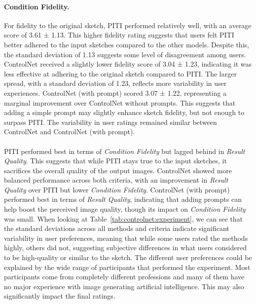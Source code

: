 \paragraph{Condition Fidelity.}
For fidelity to the original sketch, PITI performed relatively well, with an average score of 3.61 ± 1.13. This higher fidelity rating suggests that users felt PITI better adhered to the input sketches compared to the other models. Despite this, the standard deviation of 1.13 suggests some level of disagreement among users. ControlNet received a slightly lower fidelity score of 3.04 ± 1.23, indicating it was less effective at adhering to the original sketch compared to PITI. The larger spread, with a standard deviation of 1.23, reflects more variability in user experiences. ControlNet (with prompt) scored 3.07 ± 1.22, representing a marginal improvement over ControlNet without prompts. This suggests that adding a simple prompt may slightly enhance sketch fidelity, but not enough to surpass PITI. The variability in user ratings remained similar between ControlNet and ControlNet (with prompt).
\\
\\
PITI performed best in terms of \textit{Condition Fidelity} but lagged behind in \textit{Result Quality}. This suggests that while PITI stays true to the input sketches, it sacrifices the overall quality of the output images. ControlNet showed more balanced performance across both criteria, with an improvement in \textit{Result Quality} over PITI but lower \textit{Condition Fidelity}. ControlNet (with prompt) performed best in terms of \textit{Result Quality}, indicating that adding prompts can help boost the perceived image quality, though its impact on \textit{Condition Fidelity} was small. When looking at Table~\ref{tab:controlnet:experiment}, we can see that the standard deviations across all methods and criteria indicate significant variability in user preferences, meaning that while some users rated the methods highly, others did not, suggesting subjective differences in what users considered to be high-quality or similar to the sketch. The different user preferences could be explained by the wide range of participants that performed the experiment. Most participants come from completely different professions and many of them have no major experience with image generating artificial intelligence. This may also significantly impact the final ratings.

